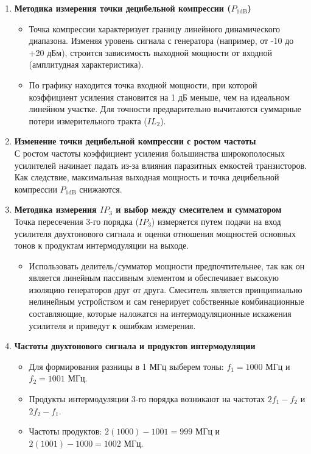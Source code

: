 \documentclass[11pt, a4paper]{article}
\begin{document}
\begin{enumerate}[label=\textbf{\arabic*.}]
    \item \textbf{Методика измерения точки децибельной компрессии ($P_{1\mathrm{dB}}$)}
    \begin{itemize}
        \item Точка компрессии характеризует границу линейного динамического диапазона. Изменяя уровень сигнала с генератора (например, от -10 до +20 дБм), строится зависимость выходной мощности от входной (амплитудная характеристика).
        \item По графику находится точка входной мощности, при которой коэффициент усиления становится на 1 дБ меньше, чем на идеальном линейном участке. Для точности предварительно вычитаются суммарные потери измерительного тракта ($IL_2$).
    \end{itemize}

    \item \textbf{Изменение точки децибельной компрессии с ростом частоты}\\
    С ростом частоты коэффициент усиления большинства широкополосных усилителей начинает падать из-за влияния паразитных емкостей транзисторов. Как следствие, максимальная выходная мощность и точка децибельной компрессии $P_{1\mathrm{dB}}$ снижаются.

    \item \textbf{Методика измерения $IP_3$ и выбор между смесителем и сумматором}\\
    Точка пересечения 3-го порядка ($IP_3$) измеряется путем подачи на вход усилителя двухтонового сигнала и оценки отношения мощностей основных тонов к продуктам интермодуляции на выходе.
    \begin{itemize}
        \item Использовать делитель/сумматор мощности предпочтительнее, так как он является линейным пассивным элементом и обеспечивает высокую изоляцию генераторов друг от друга. Смеситель является принципиально нелинейным устройством и сам генерирует собственные комбинационные составляющие, которые наложатся на интермодуляционные искажения усилителя и приведут к ошибкам измерения.
    \end{itemize}

    \item \textbf{Частоты двухтонового сигнала и продуктов интермодуляции}
    \begin{itemize}
        \item Для формирования разницы в 1 МГц выберем тоны: $f_1 = 1000 \text{ МГц}$ и $f_2 = 1001 \text{ МГц}$.
        \item Продукты интермодуляции 3-го порядка возникают на частотах $2f_1 - f_2$ и $2f_2 - f_1$.
        \item Частоты продуктов: $2(1000) - 1001 = 999 \text{ МГц}$ и $2(1001) - 1000 = 1002 \text{ МГц}$.
    \end{itemize}


\end{enumerate}
\end{document}
